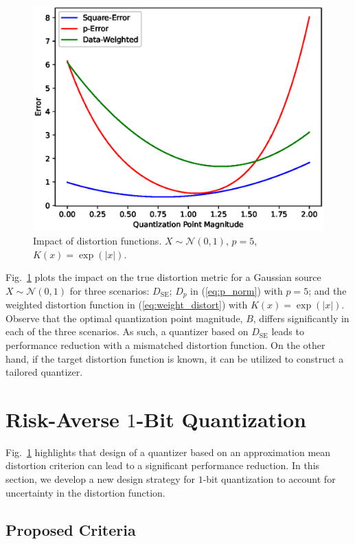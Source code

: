 \documentclass[conference]{IEEEtran}
\begin{document}
\begin{figure}
	\centering
	\includegraphics[width=\linewidth]{impact_distortion.eps}%
	\caption{Impact of distortion functions. $X \sim \mathcal{N}(0,1)$, $p = 5$, $K(x) = \exp(|x|)$.}
	\label{fig:impact_distortion}
\end{figure}

Fig.~\ref{fig:impact_distortion} plots the impact on the true distortion metric for a Gaussian source $X \sim \mathcal{N}(0,1)$ for three scenarios: $D_{\mathrm{SE}}$; $D_p$ in (\ref{eq:p_norm}) with $p = 5$; and the weighted distortion function in (\ref{eq:weight_distort}) with $K(x) = \exp(|x|)$. Observe that the optimal quantization point magnitude, $B$, differs significantly in each of the three scenarios. As such, a quantizer based on $D_{\mathrm{SE}}$ leads to performance reduction with a mismatched distortion function. On the other hand, if the target distortion function is known, it can be utilized to construct a tailored quantizer.

\section{Risk-Averse $1$-Bit Quantization}

Fig.~\ref{fig:impact_distortion} highlights that design of a quantizer based on an approximation mean distortion criterion can lead to a significant performance reduction. In this section, we develop a new design strategy for $1$-bit quantization to account for uncertainty in the distortion function.

\subsection{Proposed Criteria}
\end{document}
